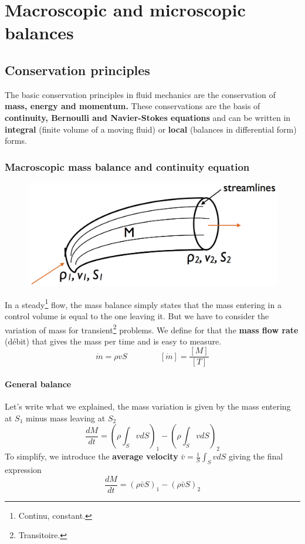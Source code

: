 
\chapter{Macroscopic and microscopic balances}
\section{Conservation principles}
	The basic conservation principles in fluid mechanics are the conservation of \textbf{mass, energy and momentum.} These conservations are the basis of \textbf{continuity, Bernoulli and Navier-Stokes equations} and can be written in \textbf{integral} (finite volume of a moving fluid) or \textbf{local} (balances in differential form) forms. 
	
	\subsection{Macroscopic mass balance and continuity equation}
		\begin{figure}
		\vspace{-5mm}
		\includegraphics[scale=0.20]{ch2/1}
		\end{figure}
		In a steady\footnote{Continu, constant.} flow, the mass balance simply states that the mass entering in a control volume is equal to the one leaving it. But we have to consider the variation of mass for transient\footnote{Transitoire.} problems. We define for that the  \textbf{mass flow rate} (débit) that gives the mass per time and is easy to measure. 
		\begin{equation}
			\dot{m} = \rho v S \qquad \qquad [\dot{m}] = \frac{[M]}{[T]}
		\end{equation}
		
		\subsubsection{General balance}
		Let's write what we explained, the mass variation is given by the mass entering at $S_1$ minus mass leaving at $S_2$		
		\begin{equation}
			\frac{dM}{dt} = \left(\rho \int _{S} v dS\right)_1 - \left(\rho \int _{S} v dS\right)_2
		\end{equation}
		To simplify, we introduce the \textbf{average velocity} $\bar{v} = \frac{1}{S}\int _S vdS$	giving the final expression
		\begin{equation}
			\frac{dM}{dt} = \left(\rho \bar{v} S\right)_1 - \left(\rho \bar{v} S\right)_2
		\end{equation}

